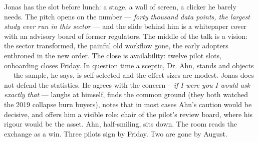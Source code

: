 

\begin{story}
Jonas has the slot before lunch: a stage, a wall of screen, a clicker he barely needs. The pitch opens on the number --- \emph{forty thousand data points, the largest study ever run in this sector} --- and the slide behind him is a whitepaper cover with an advisory board of former regulators. The middle of the talk is a vision: the sector transformed, the painful old workflow gone, the early adopters enthroned in the new order. The close is availability: twelve pilot slots, onboarding closes Friday. In question time a sceptic, Dr. Ahn, stands and objects --- the sample, he says, is self-selected and the effect sizes are modest. Jonas does not defend the statistics. He agrees with the concern -- \emph{if I were you I would ask exactly that} --- laughs at himself, finds the common ground (they both watched the 2019 collapse burn buyers), notes that in most cases Ahn's caution would be decisive, and offers him a visible role: chair of the pilot's review board, where his rigour would be the asset. Ahn, half-smiling, sits down. The room reads the exchange as a win. Three pilots sign by Friday. Two are gone by August.
\end{story}

